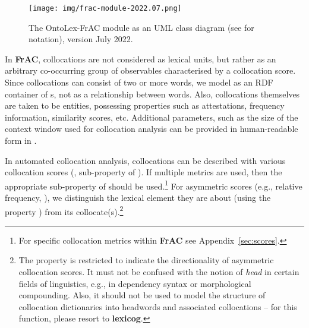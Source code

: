 \documentclass[output=paper,colorlinks,citecolor=brown]{langscibook}
\begin{document}
\begin{figure}
  \texttt{[image: img/frac-module-2022.07.png]}
  \caption{The OntoLex-FrAC module as an UML class diagram (see \citet{suchanek2020case} for notation), version July 2022.}
  \label{fig-frac}
\end{figure}

In \textbf{FrAC}, collocations are not considered as lexical units, but rather
as an arbitrary co-occurring group of observables characterised by a collocation score.
Since collocations can consist of two or more words, we model
 as an RDF container of s, not as a relationship between words. Also, collocations themselves are taken to be  entities, possessing properties such as attestations, frequency information, similarity sco\-res, etc.
Additional parameters, such as the size of the context window used for collocation analysis can be provided in human-readable form in .


In automated collocation analysis, collocations can be described with various collocation scores (, sub-property of ).
If multiple metrics are used, then the appropriate sub-property of  should be used.\footnote{For specific collocation metrics within \textbf{FrAC} see Appendix~\ref{sec:scores}.}
For asymmetric scores (e.g., relative frequency, ),
we distinguish the lexical
element they are about (using the property ) from its collocate(s).\footnote{
The property  is restricted to
indicate the directionality of asymmetric collocation scores. It must not be confused with the notion of \textit{head} in certain fields of linguistics, e.g., in dependency syntax or morphological compounding. Also, it should not
be used to model the structure of collocation dictionaries into headwords and associated collocations -- for this function, please resort to \textbf{lexicog}.}
\end{document}
